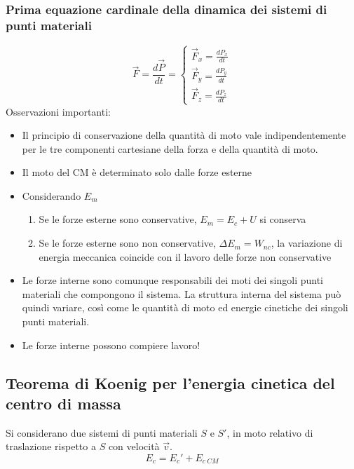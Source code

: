 \documentclass[twoside]{article}
\begin{document}
\subsubsection{Prima equazione cardinale della dinamica dei sistemi di punti materiali}
\begin{equation}
  \boxed{\vec{F} = \frac{d\vec{P}}{dt}= \begin{cases}
      \vec{F}_x = \displaystyle \frac{dP_x}{dt} \\
      \vec{F}_y = \displaystyle \frac{dP_y}{dt} \\
      \vec{F}_z = \displaystyle \frac{dP_z}{dt}
    \end{cases}}
\end{equation}
Osservazioni importanti:
\begin{itemize}
  \item Il principio di conservazione della quantità di moto vale indipendentemente per le tre componenti cartesiane della forza e della quantità di moto.
  \item Il moto del CM è determinato solo dalle forze esterne
  \item Considerando $E_m$
        \begin{enumerate}
          \item Se le forze esterne sono conservative, $E_m = E_c + U$ si conserva
          \item Se le forze esterne sono non conservative, $\Delta E_m = W_{nc}$, la variazione di energia meccanica coincide con il lavoro delle forze non conservative
        \end{enumerate}
  \item Le forze interne sono comunque responsabili dei moti dei singoli punti materiali che
        compongono il sistema. La struttura interna del sistema può quindi variare, così come
        le quantità di moto ed energie cinetiche dei singoli punti materiali.
  \item Le forze interne possono compiere lavoro!
\end{itemize}

\subsection{Teorema di Koenig per l’energia cinetica del centro di massa}
Si considerano due sistemi di punti materiali $S$ e $S'$, in moto relativo di traslazione rispetto a $S$ con velocità $\vec{v}$.
\begin{equation*}
  E_c = E_c' + E_{c\ CM}
\end{equation*}
\end{document}

